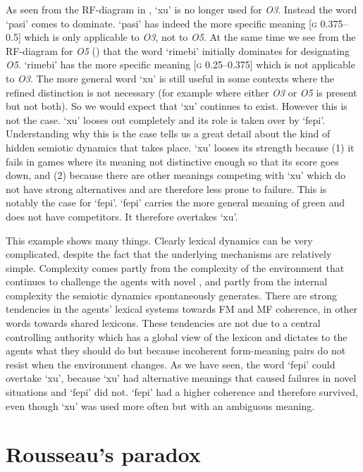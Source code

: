 As seen from the RF-diagram in , `xu' is no
longer used for \emph{O3}. Instead the word `pasi' comes to 
dominate. `pasi' has indeed the more specific 
meaning [\textsc{g} 0.375–0.5] which is only applicable to \emph{O3}, 
not to \emph{O5}. At the same time we see from the RF-diagram 
for \emph{O5} ()
that the word `rimebi' initially dominates for designating \emph{O5}. 
`rimebi' has the more specific meaning [\textsc{g} 0.25–0.375] which 
is not applicable to \emph{O3}. 
The more general word `xu' is still useful in some 
contexts where the
refined distinction is not necessary (for example where 
either \emph{O3} or \emph{O5} is present but not both). So we would expect
that `xu' continues to exist. However this is not the case. `xu'
looses out completely and its role is taken over by `fepi'. 
\clearpage
Understanding why this is the case
tells us a great detail about the kind 
of hidden semiotic dynamics that takes place. `xu' looses its
strength because (1) it fails in games where its meaning
not distinctive enough so that its score goes
down, and (2) because there 
are other meanings competing with `xu' which do not 
have strong alternatives and are therefore
less prone to failure. This is notably the case for
`fepi'. `fepi' carries the more general meaning of green
and does not have competitors. It therefore overtakes
`xu'. 

This example shows many things. Clearly
lexical dynamics can be very complicated, despite the 
fact that the underlying mechanisms are relatively 
simple. Complexity comes partly from the complexity of
the environment that continues to challenge the agents
with novel , and partly from the internal 
complexity the semiotic dynamics spontaneously generates. 
There are strong tendencies in the agents' lexical systems
towards FM and MF coherence, 
in other words towards shared lexicons. These tendencies
are not due to a central controlling authority which 
has a global view of the lexicon and dictates to the 
agents what they should do but because incoherent 
form-meaning pairs do not resist when the environment 
changes. As we have seen, the word `fepi' could 
overtake `xu', because `xu' had alternative meanings that 
caused failures in novel situations and `fepi' did not. 
`fepi' had a higher coherence and therefore survived, even
though `xu' was used more often but with an 
ambiguous meaning. 

\section{Rousseau's paradox}

